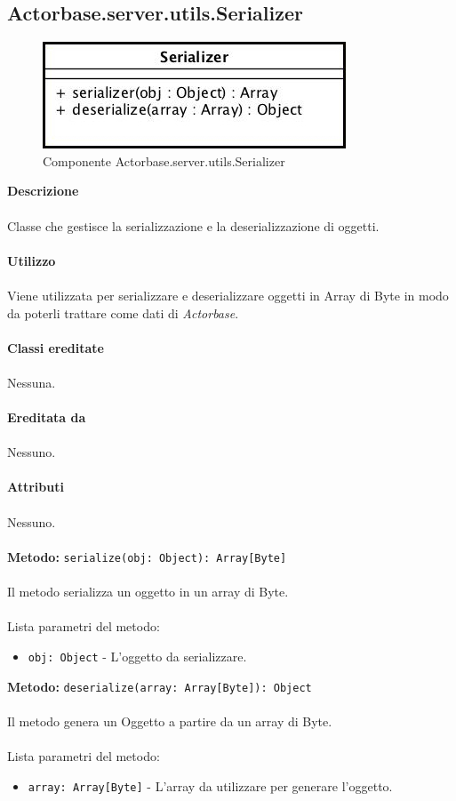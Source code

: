\documentclass[a4paper]{article}
\begin{document}
	\subsection{Actorbase.server.utils.Serializer}
		\begin{figure}[H]
			\centering
			\includegraphics[scale = 0.6]{Server/serializerClass.jpg}
			\caption{Componente Actorbase.server.utils.Serializer}
		\end{figure}
		\textbf{Descrizione}
			\\ \\
			Classe che gestisce la serializzazione e la deserializzazione di oggetti.
			\\ \\
		\textbf{Utilizzo}
			\\ \\
			Viene utilizzata per serializzare e deserializzare oggetti in Array di Byte in modo da poterli trattare come dati di \emph{Actorbase}.
			\\ \\
		\textbf{Classi ereditate}
			\\ \\
			Nessuna.
			\\ \\
		\textbf{Ereditata da}
			\\ \\
			Nessuno.
			\\ \\
		\textbf{Attributi}
			\\ \\
			Nessuno.
			\\ \\
		\textbf{Metodo: }\texttt{serialize(obj: Object): Array[Byte]}
			\\ \\
			Il metodo serializza un oggetto in un array di Byte.
			\\ \\
			Lista parametri del metodo:
			\begin{itemize}
				\item \texttt{obj: Object} - L'oggetto da serializzare.
			\end{itemize}
		\textbf{Metodo: }\texttt{deserialize(array: Array[Byte]): Object}
			\\ \\
			Il metodo genera un Oggetto a partire da un array di Byte.
			\\ \\
			Lista parametri del metodo:
			\begin{itemize}
				\item \texttt{array: Array[Byte]} - L'array da utilizzare per generare l'oggetto.
			\end{itemize}
			
\end{document}
